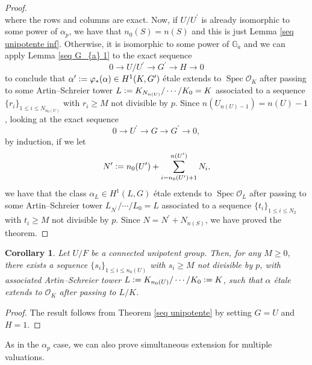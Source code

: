 \documentclass[a4paper,english,12pt]{amsart}
\newtheorem{corollary}[definition]{Corollary}
\numberwithin{equation}{section}
\newcommand{\defeq}{\vcentcolon=}
\DeclareMathOperator{\Spec}{Spec}
\renewcommand{\leq}{\leqslant}
\renewcommand{\geq}{\geqslant}
\renewcommand{\_}{\rule{0.25cm}{0.4pt}}
\begin{document}
\begin{proof}
\[    \]
    where the rows and columns are exact. Now, if $U/U^{\prime}$ is already isomorphic to some power of $\alpha_{p}$, we have that $n_{0}(S)=n(S)$ and this is just Lemma \ref{seq unipotente inf}. Otherwise, it is isomorphic to some power of $\mathbb{G}_{a}$ and we can apply Lemma \ref{seq G_{a} 1} to the exact sequence
    \[
    0\to U/U^{\prime}\to G^{\prime}\to H\to 0
    \]
    to conclude that $\alpha^{\prime}\defeq \varphi_{\ast}(\alpha)\in H^{1}(K,G^{\prime})$ étale extends to $\Spec \mathcal{O}_{K}$ after passing to some Artin--Schreier tower $L\defeq K_{N_{n(U)}}/\cdots/K_{0}=K$ associated to a sequence $\{r_{i}\}_{1\leq i\leq N_{n_{0}(U)}}$ with $r_{i}\geq M$ not divisible by $p$.
    Since $n(U_{n(U)-1})=n(U)-1$, looking at the exact sequence
    \[
    0\to U^{\prime}\to G\to G^{\prime}\to 0,
    \]
    by induction, if we let
    \[
    N^{\prime}\defeq n_{0}(U^{\prime})+\sum_{i=n_{0}(U^{\prime})+1}^{n(U^{\prime})}N_{i},
    \]
    we have that the class $\alpha_{L}\in H^{1}(L,G)$ étale extends to $\Spec \mathcal{O}_{L}$ after passing to some Artin--Schreier tower $L_{N^{\prime}}/\cdots/L_{0}=L$ associated to a sequence $\{t_{i}\}_{1\leq i\leq N_{2}}$ with $t_{i}\geq M$ not divisible by $p$. Since $N=N^{\prime}+N_{n(S)}$, we have proved the theorem.
\end{proof}

\begin{corollary}\label{unipotent}
    Let $U/F$ be a connected unipotent group. Then, for any $M\geq 0$, there exists a sequence $\{s_{i}\}_{1\leq i\leq n_{0}(U)}$ with $s_{i}\geq M$ not divisible by $p$, with associated Artin--Schreier tower $L\defeq K_{n_{0}(U)}/\cdots/K_{0}\defeq K$, such that $\alpha$ étale extends to $\mathcal{O}_{K}$ after passing to $L/K$.
\end{corollary}
\begin{proof}
    The result follows from Theorem \ref{seq unipotente} by setting $G=U$ and $H=1$.
\end{proof}

As in the $\alpha_{p}$ case, we can also prove simultaneous extension for multiple valuations.
\end{document}
